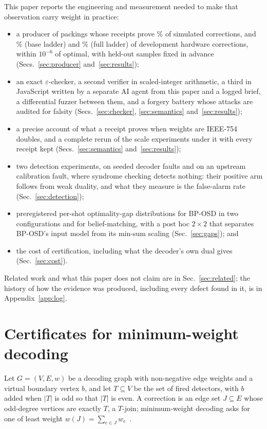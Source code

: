 \documentclass[aps,pra,twocolumn,superscriptaddress,nofootinbib,longbibliography,floatfix]{revtex4-2}
\newcommand{\eps}{\varepsilon}
\newcommand{\T}{T}
\begin{document}
This paper reports the engineering and measurement needed to make that observation carry weight in practice:
\begin{itemize}
\item a producer of packings whose receipts prove \EpsSimAcceptedPct\% of simulated corrections, and \EpsHwGenFourPct\% (base ladder) and \EpsHwGenSixPct\% (full ladder) of development hardware corrections, within $10^{-6}$ of optimal, with held-out samples fixed in advance (Secs.~\ref{sec:producer} and~\ref{sec:results});
\item an exact $\eps$-checker, a second verifier in scaled-integer arithmetic, a third in JavaScript written by a separate AI agent from this paper and a logged brief, a differential fuzzer between them, and a forgery battery whose attacks are audited for falsity (Secs.~\ref{sec:checker}, \ref{sec:semantics} and~\ref{sec:results});
\item a precise account of what a receipt proves when weights are IEEE-754 doubles, and a complete rerun of the scale experiments under it with every receipt kept (Secs.~\ref{sec:semantics} and~\ref{sec:results});
\item two detection experiments, on seeded decoder faults and on an upstream calibration fault, where syndrome checking detects nothing: their positive arm follows from weak duality, and what they measure is the false-alarm rate (Sec.~\ref{sec:detection});
\item preregistered per-shot optimality-gap distributions for BP-OSD in two configurations and for belief-matching, with a post hoc $2\times2$ that separates BP-OSD's input model from its min-sum scaling (Sec.~\ref{sec:gaps}); and
\item the cost of certification, including what the decoder's own dual gives (Sec.~\ref{sec:cost}).
\end{itemize}
Related work and what this paper does not claim are in Sec.~\ref{sec:related}; the history of how the evidence was produced, including every defect found in it, is in Appendix~\ref{app:log}.

\section{Certificates for minimum-weight decoding}
\label{sec:certificates}

Let $G=(V,E,w)$ be a decoding graph with non-negative edge weights and a virtual boundary vertex $b$, and let $\T\subseteq V$ be the set of fired detectors, with $b$ added when $|\T|$ is odd so that $|\T|$ is even. A correction is an edge set $J\subseteq E$ whose odd-degree vertices are exactly $\T$, a $\T$-join; minimum-weight decoding asks for one of least weight $w(J)=\sum_{e\in J}w_e$~\cite{dennis2002topological,higgott2025sparse}.
\end{document}
